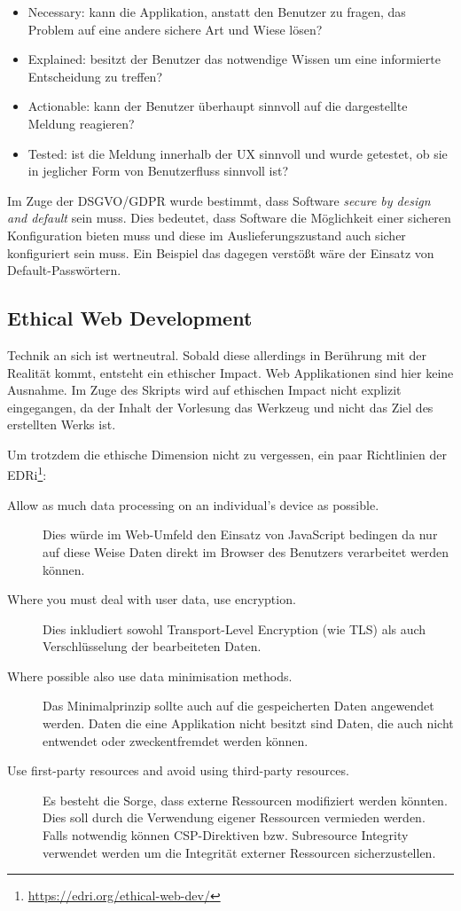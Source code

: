 \begin{itemize}
	\item Necessary: kann die Applikation, anstatt den Benutzer zu fragen, das Problem auf eine andere sichere Art und Wiese lösen?
	\item Explained: besitzt der Benutzer das notwendige Wissen um eine informierte Entscheidung zu treffen?
	\item Actionable: kann der Benutzer überhaupt sinnvoll auf die dargestellte Meldung reagieren?
	\item Tested: ist die Meldung innerhalb der UX sinnvoll und wurde getestet, ob sie in jeglicher Form von Benutzerfluss sinnvoll ist?
\end{itemize}

Im Zuge der DSGVO/GDPR wurde bestimmt, dass Software \textit{secure by design and default} sein muss. Dies bedeutet, dass Software die Möglichkeit einer sicheren Konfiguration bieten muss und diese im Auslieferungszustand auch sicher konfiguriert sein muss. Ein Beispiel das dagegen verstößt wäre der Einsatz von Default-Passwörtern.

\subsection{Ethical Web Development}

Technik an sich ist wertneutral. Sobald diese allerdings in Berührung mit der Realität kommt, entsteht ein ethischer Impact. Web Applikationen sind hier keine Ausnahme. Im Zuge des Skripts wird auf ethischen Impact nicht explizit eingegangen, da der Inhalt der Vorlesung das Werkzeug und nicht das Ziel des erstellten Werks ist.

Um trotzdem die ethische Dimension nicht zu vergessen, ein paar Richtlinien der EDRi\footnote{\url{https://edri.org/ethical-web-dev/}}:

\begin{description}
	\item[Allow as much data processing on an individual’s device as possible.] Dies würde im Web-Umfeld den Einsatz von JavaScript bedingen da nur auf diese Weise Daten direkt im Browser des Benutzers verarbeitet werden können.
	\item[Where you must deal with user data, use encryption.] Dies inkludiert sowohl Transport-Level Encryption (wie TLS) als auch Verschlüsselung der bearbeiteten Daten.
	\item[Where possible also use data minimisation methods.] Das Minimalprinzip sollte auch auf die gespeicherten Daten angewendet werden. Daten die eine Applikation nicht besitzt sind Daten, die auch nicht entwendet oder zweckentfremdet werden können.
	\item[Use first-party resources and avoid using third-party resources.] Es besteht die Sorge, dass externe Ressourcen modifiziert werden könnten. Dies soll durch die Verwendung eigener Ressourcen vermieden werden. Falls notwendig können CSP-Direktiven bzw. Subresource Integrity verwendet werden um die Integrität externer Ressourcen sicherzustellen.
\end{description}
